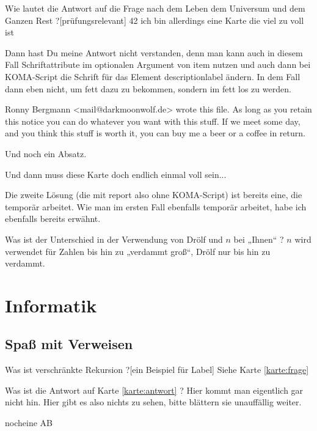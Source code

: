 \documentclass[a6paper,14pt,print,grid=both]{kartei}
\begin{document}
	\begin{karte}[Lebensphilosophie]{Wie lautet die Antwort auf die Frage nach dem Leben dem Universum und dem Ganzen Rest ?}[prüfungsrelevant]
	42
	ich bin allerdings eine Karte die viel zu voll ist 
	
	Dann hast Du meine Antwort nicht verstanden, denn man kann auch in diesem
	Fall Schriftattribute im optionalen Argument von item nutzen und auch dann
	bei KOMA-Script die Schrift für das Element descriptionlabel ändern. In dem
	Fall dann eben nicht, um fett dazu zu bekommen, sondern im fett los zu
	werden.
	
	Ronny Bergmann <mail@darkmoonwolf.de> wrote this file. As long as you retain 
	 this notice you can do whatever you want with this stuff. If we meet some day,
	 and you think  this stuff is worth it, you can buy me a beer or a coffee in return.
	
	Und noch ein Absatz.
	
	Und dann muss diese Karte doch endlich einmal voll sein...
	
	Die zweite Lösung (die mit report also ohne KOMA-Script) ist bereits eine,
	die temporär arbeitet. Wie man im ersten Fall ebenfalls temporär arbeitet,
	habe ich ebenfalls bereits erwähnt.
	\end{karte}
%	
	\begin{karte}[Zahlenkunde]{Was ist der Unterschied in der Verwendung von Drölf und $n$ bei „Ihnen“ ?}
	$n$ wird verwendet für Zahlen bis hin zu „verdammt groß“, Drölf nur bis hin zu verdammt.
	\end{karte}
%
	\section*{Informatik}
	\subsection*{Spaß mit Verweisen}
	\renewcommand{\kommentarstil}{\textsc}
%
	\begin{karte}{Was ist verschränkte Rekursion ?}[ein Beispiel für Label]
	\label{karte:antwort} Siehe Karte \ref{karte:frage}
	\end{karte}
%
	\begin{karte}{Was ist die Antwort auf Karte \ref{karte:antwort} ?}
	\label{karte:frage}		Hier kommt man eigentlich gar nicht hin. Hier gibt es also nichts zu sehen, bitte blättern sie unauffällig weiter.
	\end{karte}
	\begin{karte}{nocheine}
		AB
	\end{karte}
\end{document}
